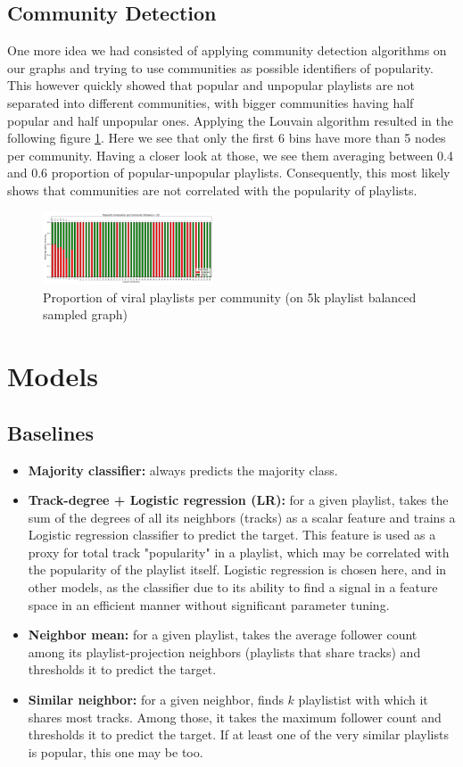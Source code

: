\documentclass[9pt,twocolumn,twoside]{pnas-report}
\begin{document}
\subsection{Community Detection}
One more idea we had consisted of applying community detection algorithms on our graphs and trying to use communities as possible identifiers of popularity. This however quickly showed that popular and unpopular playlists are not separated into different communities, with bigger communities having half popular and half unpopular ones. Applying the Louvain algorithm resulted in the following figure \ref{fig:community}. Here we see that only the first 6 bins have more than 5 nodes per community. Having a closer look at those, we see them averaging between 0.4 and 0.6 proportion of popular-unpopular playlists. Consequently, this most likely shows that communities are not correlated with the popularity of playlists.

\begin{figure}[htbp]
\centering
\includegraphics[width=0.45\textwidth]{fig/community_plot.png}
\caption{Proportion of viral playlists per community (on 5k playlist balanced sampled graph)}
\label{fig:community}
\end{figure}

\section{Models}
\subsection{Baselines}
\begin{itemize}
    \item \textbf{Majority classifier:} always predicts the majority class.
    \item \textbf{Track-degree + Logistic regression (LR):} for a given playlist, takes the sum of the degrees of all its neighbors (tracks) as a scalar feature and trains a Logistic regression classifier to predict the target. This feature is used as a proxy for total track "popularity" in a playlist, which may be correlated with the popularity of the playlist itself. Logistic regression is chosen here, and in other models, as the classifier due to its ability to find a signal in a feature space in an efficient manner without significant parameter tuning.
    \item \textbf{Neighbor mean:} for a given playlist, takes the average follower count among its playlist-projection neighbors (playlists that share tracks) and thresholds it to predict the target.
    \item \textbf{Similar neighbor:} for a given neighbor, finds $k$ playlistist with which it shares most tracks. Among those, it takes the maximum follower count and thresholds it to predict the target. If at least one of the very similar playlists is popular, this one may be too.
\end{itemize}
\end{document}
